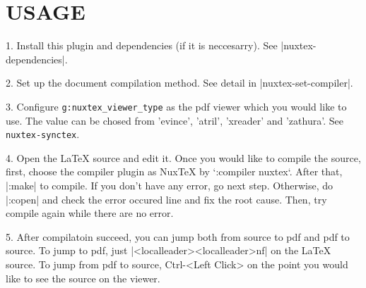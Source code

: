 \section{USAGE}

1. Install this plugin and dependencies (if it is neccesarry).
   See |nuxtex-dependencies|.

2. Set up the document compilation method. See detail in |nuxtex-set-compiler|.

3. Configure \verb|g:nuxtex_viewer_type| as the pdf viewer which you would like to use. The value can be chosed from 'evince', 'atril', 'xreader' and 'zathura'. See \verb|nuxtex-synctex|.

4. Open the LaTeX source and edit it. Once you would like to compile the source, first, choose the compiler plugin as NuxTeX by `:compiler nuxtex`.
   After that, |:make| to compile. If you don't have any error, go next step.
   Otherwise, do |:copen| and check the error occured line and fix the root cause. Then, try compile again while there are no error.

5. After compilatoin succeed, you can jump both from source to pdf and pdf to source. To jump to pdf, just |<localleader><localleader>nf| on the LaTeX source. To jump from pdf to source, Ctrl-<Left Click> on the point you would like to see the source on the viewer.

